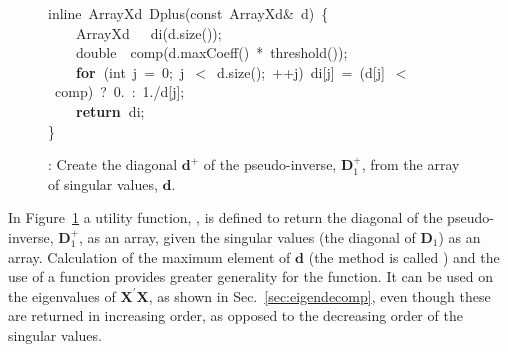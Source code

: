 \documentclass[shortnames,article]{jss}
\newcommand{\hlstd}[1]{\textcolor[rgb]{0,0,0}{#1}}
\newcommand{\hlnum}[1]{\textcolor[rgb]{0,0,0}{#1}}
\newcommand{\hlopt}[1]{\textcolor[rgb]{0,0,0}{#1}}
\newcommand{\hlkwa}[1]{\textcolor[rgb]{0.61,0.13,0.93}{\bf{#1}}}
\newcommand{\hlkwb}[1]{\textcolor[rgb]{0.13,0.54,0.13}{#1}}
\newcommand{\hlkwc}[1]{\textcolor[rgb]{0,0,1}{#1}}
\newcommand{\hlkwd}[1]{\textcolor[rgb]{0,0,0}{#1}}
\begin{document}
\begin{figure}[htb]
  \noindent
  \ttfamily
  \hlstd{}\hlkwc{inline\ }\hlstd{ArrayXd\ }\hlkwd{Dplus}\hlstd{}\hlopt{(}\hlstd{}\hlkwb{const\ }\hlstd{ArrayXd}\hlopt{\&\ }\hlstd{d}\hlopt{)\ \{}\hspace*{\fill}\\
  \hlstd{}\hlstd{\ \ \ \ }\hlstd{ArrayXd}\hlstd{\ \ \ }\hlstd{}\hlkwd{di}\hlstd{}\hlopt{(}\hlstd{d}\hlopt{.}\hlstd{}\hlkwd{size}\hlstd{}\hlopt{());}\hspace*{\fill}\\
  \hlstd{}\hlstd{\ \ \ \ }\hlstd{}\hlkwb{double}\hlstd{\ \ }\hlkwb{}\hlstd{}\hlkwd{comp}\hlstd{}\hlopt{(}\hlstd{d}\hlopt{.}\hlstd{}\hlkwd{maxCoeff}\hlstd{}\hlopt{()\ {*}\ }\hlstd{}\hlkwd{threshold}\hlstd{}\hlopt{());}\hspace*{\fill}\\
  \hlstd{}\hlstd{\ \ \ \ }\hlstd{}\hlkwa{for\ }\hlstd{}\hlopt{(}\hlstd{}\hlkwb{int\ }\hlstd{j\ }\hlopt{=\ }\hlstd{}\hlnum{0}\hlstd{}\hlopt{;\ }\hlstd{j\ }\hlopt{$<$\ }\hlstd{d}\hlopt{.}\hlstd{}\hlkwd{size}\hlstd{}\hlopt{();\ ++}\hlstd{j}\hlopt{)\ }\hlstd{di}\hlopt{{[}}\hlstd{j}\hlopt{{]}\ =\ (}\hlstd{d}\hlopt{{[}}\hlstd{j}\hlopt{{]}\ $<$\ }\hlstd{comp}\hlopt{)\ }\hlstd{?\ }\hlnum{0}\hlstd{}\hlopt{.\ :\ }\hlstd{}\hlnum{1}\hlstd{}\hlopt{./}\hlstd{d}\hlopt{{[}}\hlstd{j}\hlopt{{]};}\hspace*{\fill}\\
  \hlstd{}\hlstd{\ \ \ \ }\hlstd{}\hlkwa{return\ }\hlstd{di}\hlopt{;}\hspace*{\fill}\\
  \hlstd{}\hlopt{\}}\hlstd{}\hspace*{\fill}\\
  \mbox{}
  \normalfont
  \normalsize
  \caption{: Create the diagonal $\bm d^+$ of the pseudo-inverse, $\bm D_1^+$, from the array of singular values, $\bm d$.}
  \label{Dplus}
\end{figure}

In Figure~\ref{Dplus} a utility function, , is defined to
return the diagonal of the pseudo-inverse, $\bm D_1^+$, as an array,
given the singular values (the diagonal of $\bm D_1$) as an array.
Calculation of the maximum element of $\bm d$ (the method is called
) and the use of a  function
provides greater generality for the function.  It can be used on the
eigenvalues of $\bm X^\prime\bm X$, as shown in
Sec.~\ref{sec:eigendecomp}, even though these are returned in
increasing order, as opposed to the decreasing order of the singular
values.
\end{document}
